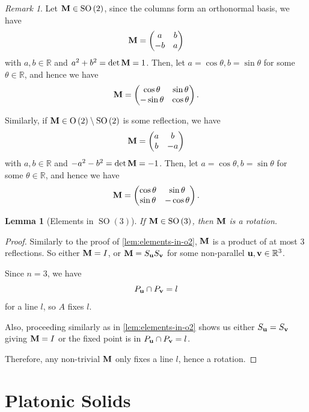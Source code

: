 \documentclass{article}
\newtheorem{lemma}[theorem]{Lemma}
\theoremstyle{definition}
\theoremstyle{remark}
\newtheorem{remark}[theorem]{Remark}
\newcommand{\pqty}[1]{\left(#1\right)}
\newcommand{\pmqty}[1]{\begin{pmatrix}#1\end{pmatrix}}
\newcommand{\RR}{\mathbb{R}}
\newcommand{\identityM}{I}
\newcommand{\SO}{\operatorname{SO}}
\newcommand{\Or}{\operatorname{O}}
\begin{document}
\begin{remark}
    Let \(\vb{M} \in \SO\pqty{2}\), since the columns form an orthonormal basis, we have
    \[
        \vb{M} = \pmqty{a & b \\ -b & a}
    \]
    with \(a, b \in \RR\) and \(a^2 + b^2 = \det \vb{M} = 1\). Then, let \(a = \cos \theta, b = \sin \theta\) for some \(\theta \in \RR\), and hence we have
    \[
        \vb{M} = \pmqty{\cos \theta & \sin \theta \\ - \sin \theta & \cos \theta}.
    \]

    Similarly, if \(\vb{M} \in \Or\pqty{2} \setminus \SO\pqty{2}\) is some reflection, we have
    \[
        \vb{M} = \pmqty{a & b \\ b & -a}
    \]
    with \(a, b \in \RR\) and \(-a^2 - b^2 = \det \vb{M} = -1\). Then, let \(a = \cos \theta, b = \sin \theta\) for some \(\theta \in \RR\), and hence we have
    \[
        \vb{M} = \pmqty{\cos \theta & \sin \theta \\ \sin \theta & -\cos \theta}.
    \]
\end{remark}

\begin{lemma}[Elements in \(\SO\pqty{3}\)]
    \label{lem:elements-in-so3}%
    If \(\vb{M} \in \SO\pqty{3}\), then \(\vb{M}\) is a rotation.
\end{lemma}

\begin{proof}
    Similarly to the proof of \autoref{lem:elements-in-o2}, \(\vb{M}\) is a product of at most \(3\) reflections. So either \(\vb{M} = \identityM\), or \(\vb{M} = S_{\vb{u}} S_{\vb{v}}\) for some non-parallel \(\vb{u}, \vb{v} \in \RR^3\).

    Since \(n = 3\), we have
    \[
        P_{\vb{u}} \cap P_{\vb{v}} = l
    \]
    for a line \(l\), so \(A\) fixes \(l\).

    Also, proceeding similarly as in \autoref{lem:elements-in-o2} shows us either \(S_{\vb{u}} = S_{\vb{v}}\) giving \(\vb{M} = \identityM\) or the fixed point is in \(P_{\vb{u}} \cap P_{\vb{v}} = l\).

    Therefore, any non-trivial \(\vb{M}\) only fixes a line \(l\), hence a rotation.
\end{proof}

\section{Platonic Solids}
\label{sec:platonic-solids}
\end{document}
